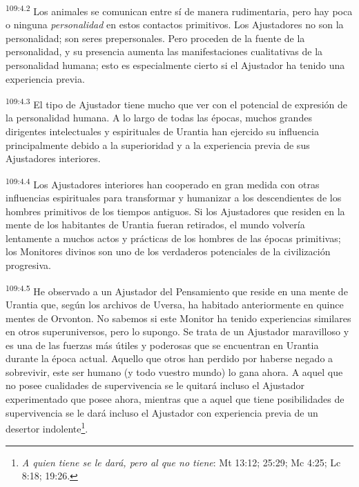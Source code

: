 \documentclass[twoside, 11pt]{book}
\begin{document}
\par
\textsuperscript{109:4.2} Los animales se comunican entre sí de manera rudimentaria, pero hay poca o ninguna \textit{personalidad} en estos contactos primitivos. Los Ajustadores no son la personalidad; son seres prepersonales. Pero proceden de la fuente de la personalidad, y su presencia aumenta las manifestaciones cualitativas de la personalidad humana; esto es especialmente cierto si el Ajustador ha tenido una experiencia previa.

\par
\textsuperscript{109:4.3} El tipo de Ajustador tiene mucho que ver con el potencial de expresión de la personalidad humana. A lo largo de todas las épocas, muchos grandes dirigentes intelectuales y espirituales de Urantia han ejercido su influencia principalmente debido a la superioridad y a la experiencia previa de sus Ajustadores interiores.

\par
\textsuperscript{109:4.4} Los Ajustadores interiores han cooperado en gran medida con otras influencias espirituales para transformar y humanizar a los descendientes de los hombres primitivos de los tiempos antiguos. Si los Ajustadores que residen en la mente de los habitantes de Urantia fueran retirados, el mundo volvería lentamente a muchos actos y prácticas de los hombres de las épocas primitivas; los Monitores divinos son uno de los verdaderos potenciales de la civilización progresiva.

\par
\textsuperscript{109:4.5} He observado a un Ajustador del Pensamiento que reside en una mente de Urantia que, según los archivos de Uversa, ha habitado anteriormente en quince mentes de Orvonton. No sabemos si este Monitor ha tenido experiencias similares en otros superuniversos, pero lo supongo. Se trata de un Ajustador maravilloso y es una de las fuerzas más útiles y poderosas que se encuentran en Urantia durante la época actual. Aquello que otros han perdido por haberse negado a sobrevivir, este ser humano (y todo vuestro mundo) lo gana ahora. A aquel que no posee cualidades de supervivencia se le quitará incluso el Ajustador experimentado que posee ahora, mientras que a aquel que tiene posibilidades de supervivencia se le dará incluso el Ajustador con experiencia previa de un desertor indolente\footnote{\textit{A quien tiene se le dará, pero al que no tiene}: Mt 13:12; 25:29; Mc 4:25; Lc 8:18; 19:26.}.
\end{document}
